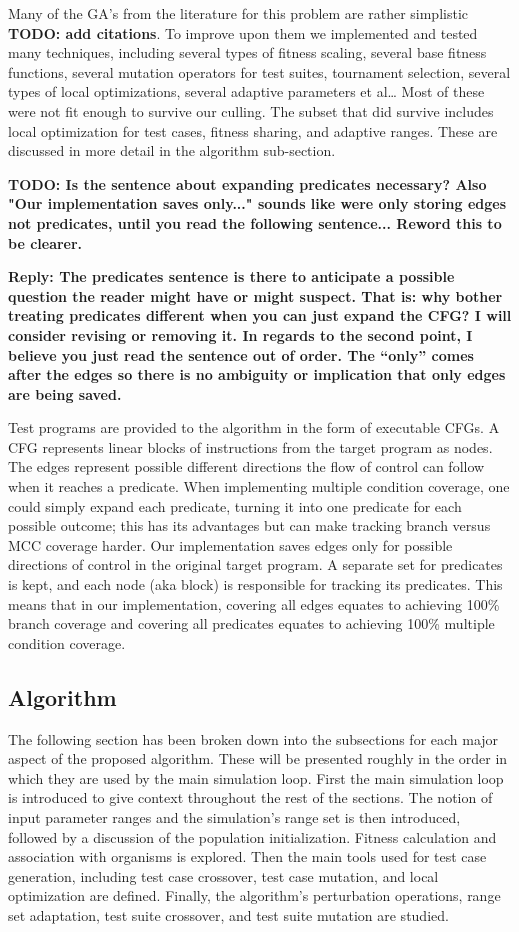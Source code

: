 \documentclass[runningheads]{llncs}
\begin{document}
Many of the GA’s from the literature for this problem are rather simplistic \textbf{TODO: add citations}. To improve upon them we implemented and tested many techniques, including several types of fitness scaling, several base fitness functions, several mutation operators for test suites, tournament selection, several types of local optimizations, several adaptive parameters et al… Most of these were not fit enough to survive our culling. The subset that did survive includes local optimization for test cases, fitness sharing, and adaptive ranges. These are discussed in more detail in the algorithm sub-section.

\textbf{TODO: Is the sentence about expanding predicates necessary? Also "Our implementation saves only..." sounds like were only storing edges not predicates, until you read the following sentence... Reword this to be clearer.}

\textbf{Reply: The predicates sentence is there to anticipate a possible question the reader might have or might suspect. That is: why bother treating predicates different when you can just expand the CFG? I will consider revising or removing it. In regards to the second point, I believe you just read the sentence out of order. The ``only'' comes after the edges so there is no ambiguity or implication that only edges are being saved.}

Test programs are provided to the algorithm in the form of executable CFGs. A CFG represents linear blocks of instructions from the target program as nodes. The edges represent possible different directions the flow of control can follow when it reaches a predicate.  When implementing multiple condition coverage, one could simply expand each predicate, turning it into one predicate for each possible outcome; this has its advantages but can make tracking branch versus MCC coverage harder. Our implementation saves edges only for possible directions of control in the original target program. A separate set for predicates is kept, and each node (aka block) is responsible for tracking its predicates. This means that in our implementation, covering all edges equates to achieving 100\% branch coverage and covering all predicates equates to achieving 100\% multiple condition coverage. 

\subsection{Algorithm}

The following section has been broken down into the subsections for each major aspect of the proposed algorithm. These will be presented roughly in the order in which they are used by the main simulation loop. First the main simulation loop is introduced to give context throughout the rest of the sections. The notion of input parameter ranges and the simulation's range set is then introduced, followed by a discussion of the population initialization. Fitness calculation and association with organisms is explored. Then the main tools used for test case generation, including test case crossover, test case mutation, and local optimization are defined. Finally, the algorithm's perturbation operations, range set adaptation, test suite crossover, and test suite mutation are studied.
\end{document}
